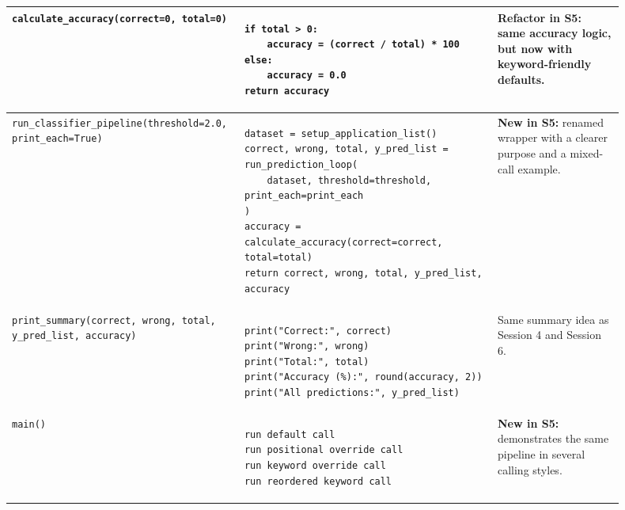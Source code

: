 \begin{landscape}
\begin{longtable}{|p{0.3\linewidth}|p{0.4\linewidth}|p{0.2\linewidth}|}
\hline
\texttt{calculate\_accuracy(correct=0, total=0)} & \begin{verbatim}
if total > 0:
    accuracy = (correct / total) * 100
else:
    accuracy = 0.0
return accuracy
\end{verbatim}
& \textbf{Refactor in S5:} same accuracy logic, but now with keyword-friendly defaults. \\
\hline
\texttt{run\_classifier\_pipeline(threshold=2.0, print\_each=True)} & \begin{verbatim}
dataset = setup_application_list()
correct, wrong, total, y_pred_list = run_prediction_loop(
    dataset, threshold=threshold, print_each=print_each
)
accuracy = calculate_accuracy(correct=correct, total=total)
return correct, wrong, total, y_pred_list, accuracy
\end{verbatim}
& \textbf{New in S5:} renamed wrapper with a clearer purpose and a mixed-call example. \\
\hline
\texttt{print\_summary(correct, wrong, total, y\_pred\_list, accuracy)} & \begin{verbatim}
print("Correct:", correct)
print("Wrong:", wrong)
print("Total:", total)
print("Accuracy (%):", round(accuracy, 2))
print("All predictions:", y_pred_list)
\end{verbatim}
& Same summary idea as Session 4 and Session 6. \\
\hline
\texttt{main()} & \begin{verbatim}
run default call
run positional override call
run keyword override call
run reordered keyword call
\end{verbatim}
& \textbf{New in S5:} demonstrates the same pipeline in several calling styles. \\
\hline
\end{longtable}
\end{landscape}
